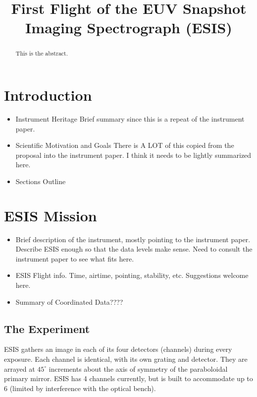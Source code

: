 \renewcommand{\arcsec}{$^{\prime\prime}$} %
\renewcommand{\arcmin}{$^{\prime}$}
\newcommand{\rts}[1]{{\color{violet} RTS: #1}} %
\newcommand{\jdp}[1]{{\color{red} JDP: #1}} %
\newcommand{\cck}[1]{{\color{brown} CCK: #1}} %
\newcommand{\amy}[1]{{\color{cyan} ARW: #1}} 

\title{First Flight of the EUV Snapshot Imaging Spectrograph (ESIS)}

\begin{abstract}
    This is the abstract.
\end{abstract} 

\section{Introduction}
	\begin{itemize}
        \item Instrument Heritage
            Brief summary since this is a repeat of the instrument paper.
        \item Scientific Motivation and Goals
            There is A LOT of this copied from the proposal into the instrument paper.  I think it needs to be lightly summarized here.
        \item Sections Outline
    \end{itemize}
    

\section{ESIS Mission}
    \begin{itemize}
        \item Brief description of the instrument, mostly pointing to the instrument paper.  Describe ESIS enough so that the data levels make sense. Need to consult the instrument paper to see what fits here. 
        \item ESIS Flight info.  Time, airtime, pointing, stability, etc.  Suggestions welcome here.
        \item Summary of Coordinated Data????
    \end{itemize}
    
	\subsection{The Experiment}
		ESIS gathers an image in each of its four detectors (channels) during every exposure.  
		Each channel is identical, with its own grating and detector. They are arrayed at $45^{\circ}$ increments about the axis of symmetry of the paraboloidal primary mirror. ESIS has 4 channels currently, but is built to accommodate up to 6 (limited by interference with the optical bench).
		
